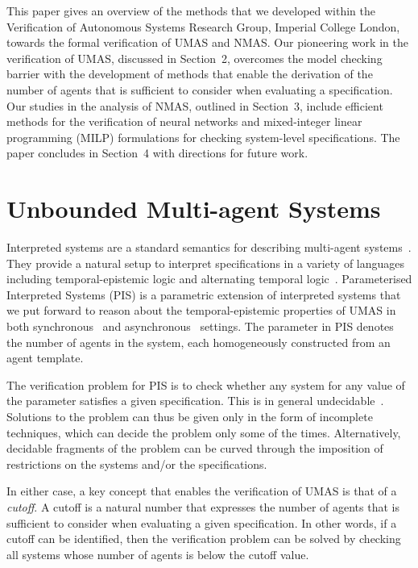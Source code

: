 \documentclass{article}
\begin{document}
This paper gives an overview of the methods that we developed within the
Verification of Autonomous Systems Research
Group, Imperial College London, 
towards the formal verification
of UMAS and NMAS.  Our pioneering work in the verification of UMAS, discussed in
Section~2, overcomes the model checking barrier with the development of methods
that enable the derivation of the number of agents that is sufficient to
consider when evaluating a specification. Our studies in the analysis of NMAS,
outlined in Section~3, include efficient methods for the verification of neural
networks and mixed-integer linear programming (MILP) formulations for checking
system-level specifications.  The paper concludes in Section~4 with directions
for future work.


\section{Unbounded Multi-agent Systems}

Interpreted systems are a standard semantics for describing multi-agent
systems~\cite{Fagin+95a}.  They provide a natural setup to interpret
specifications in a variety of languages including temporal-epistemic logic and
alternating temporal logic~\cite{Fagin+95b,LomuscioRaimondi06c}. Parameterised
Interpreted Systems (PIS)  is a parametric extension of interpreted systems
that we put forward  to reason about the temporal-epistemic properties of UMAS
in both synchronous~\cite{KouvarosLomuscio15b} and
asynchronous~\cite{KouvarosLomuscio16a} settings.   The parameter in PIS denotes
the number of agents in the system, each homogeneously constructed from an agent
template. 

The verification problem for PIS is to
check whether any system for any value of the parameter satisfies a given
specification.   
This is in general undecidable~\cite{AptKozen86}.
Solutions to the problem can thus be given only in the form of incomplete techniques, which can decide the problem only some of the times. 
Alternatively, decidable fragments of the problem can be curved through the imposition of 
restrictions on the systems and/or the specifications.  

In either case, a key concept that enables the verification of UMAS is that of
a {\em cutoff}.  A cutoff is a natural number that expresses the number of
agents that is sufficient to consider when evaluating a given specification. In
other words, if a cutoff can be identified, then the verification problem can
be solved by checking all systems whose number of agents is below the cutoff
value.
\end{document}
